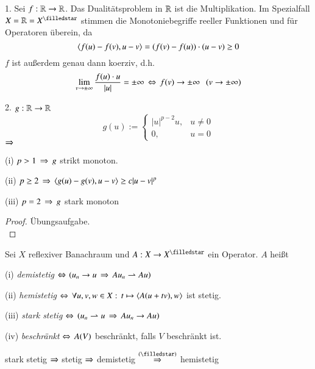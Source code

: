 \begin{description}
    \item{1.}
    Sei $f:\mathbb{R}\rightarrow\mathbb{R}$. Das Dualitätsproblem in $\mathbb{R}$ ist die Multiplikation. Im Spezialfall $X=\R=X^\star$
    stimmen die Monotoniebegriffe reeller Funktionen und für Operatoren überein, da
    \[
        \langle f(u)-f(v),u-v\rangle=(f(v)-f(u))\cdot(u-v)\geq 0
    \]
    $f$ ist außerdem genau dann koerziv, d.h.
    \[
        \lim_{v\rightarrow \pm \infty} \frac{f(u)\cdot u}{|u|}=\pm\infty \, \Leftrightarrow \, f(v)\rightarrow \pm \infty\hspace{.25cm}(v\rightarrow\pm
                \infty)
    \]
    \item{2.}
    $g:\mathbb{R}\rightarrow \mathbb{R}$
    \[
        g(u):=\begin{cases} |u|^{p-2}u, & u\neq 0\\ 0, & u=0 \end{cases}
    \]
    $\Rightarrow$ \begin{description}
        \item{(i)}
        $p>1 \, \Rightarrow \, g$ strikt monoton.
        \item{(ii)}
        $p\geq 2 \, \Rightarrow \, \langle g(u)-g(v),u-v\rangle \geq c|u-v|^p$
        \item{(iii)}
        $p=2 \, \Rightarrow \, g$ stark monoton
    \end{description}
    \begin{proof}
    Übungsaufgabe. \[ \]
    \end{proof}
\end{description}

\begin{defi}\label{4.2}
    Sei $X$ reflexiver Banachraum und $A:X\ra X^\star$ ein Operator. $A$ heißt
    \begin{description}
    \item{(i)}
    \textit{demistetig} $\Leftrightarrow$ $\left( u_n\rightarrow u\, \Rightarrow \, Au_n\rightharpoonup Au \right)$
    \item{(ii)}
    \textit{hemistetig} $\Leftrightarrow \, \forall u,v,w \in X: \, t\mapsto \langle A(u+tv),w\rangle$ ist stetig.
    \item{(iii)}
    \textit{stark stetig} $\Leftrightarrow \, \left( u_n \rightharpoonup u\, \Rightarrow \, Au_n\rightarrow Au \right)$
    \item{(iv)}
    \textit{beschränkt} $\Leftrightarrow \, A(V)$ beschränkt, falls $V$ beschränkt ist. 
    \end{description}
\end{defi}

\begin{remark}
    stark stetig $\Rightarrow$ stetig $\Rightarrow$ demistetig $\overset{(\star)}{\Ra}$ hemistetig
\end{remark}

